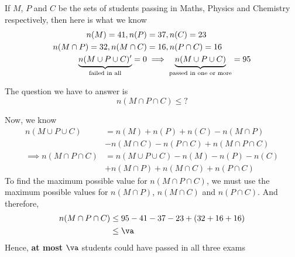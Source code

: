 \begin{solution}[\fullpage]
  If $M$, $P$ and $C$ be the sets of students passing in Maths, Physics and 
  Chemistry respectively, then here is what we know 
  \begin{align}
    n(M) = 41, n(P)&=37, n(C)=23 \\
    n(M\cap P) = 32, n(M\cap C) &= 16, n(P\cap C) = 16 \\
    \underbrace{n(M\cup P\cup C)'}_{\text{failed in all}} = 0 &\implies
    \underbrace{n(M\cup P\cup C)}_{\text{passed in one or more}} = 95
  \end{align}

  The question we have to answer is \[ n(M\cap P\cap C)\leq ?\]
  
  Now, we know
  \begin{align}
    n(M\cup P\cup C) &= n(M) + n(P) + n(C) - n(M\cap P) \nonumber \\
                     &- n(M\cap C) - n(P\cap C) + n(M\cap P\cap C) \\
    \implies n(M\cap P\cap C) &= n(M\cup P\cup C) - n(M) - n(P) - n(C) \nonumber \\
                              &+ n(M\cap P) + n(M\cap C) + n(P\cap C)
  \end{align}
  To find the maximum possible value for $n(M\cap P\cap C)$, we must use the maximum possible 
  values for $n(M\cap P)$, $n(M\cap C)$ and $n(P\cap C)$. And therefore, 
  \begin{align}
    n(M\cap P\cap C) &\leq \vt-\vm-\vp-\vc + (\vx + \vy + \vz) \\
                     &\leq \va
  \end{align}
  Hence, \textbf{at most} $\va$ students could have passed in all three exams
\end{solution}

